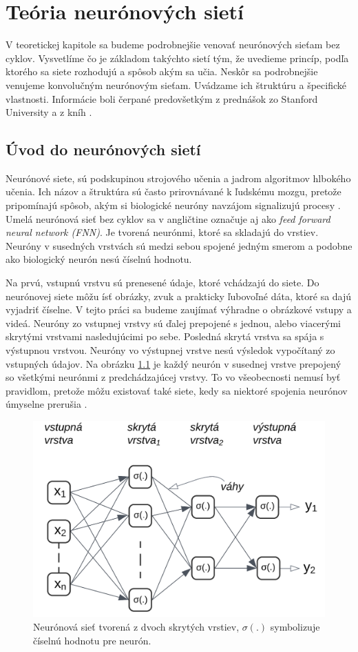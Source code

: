 \chapter{Teória neurónových sietí}\label{chap:theory}

V teoretickej kapitole sa budeme podrobnejšie venovať neurónových sieťam bez cyklov. Vysvetlíme čo je základom takýchto sietí tým, že uvedieme princíp, podľa ktorého sa siete rozhodujú a spôsob akým sa učia. Neskôr sa podrobnejšie venujeme konvolučným neurónovým sieťam. Uvádzame ich štruktúru a špecifické vlastnosti. Informácie boli čerpané predovšetkým z prednášok zo Stanford University \cite{SF} a z kníh \cite{RosinPaulL2019RIAa, Goodfellow-et-al-2016}. 

\section{Úvod do neurónových sietí}

Neurónové siete, sú podskupinou strojového učenia a jadrom algoritmov hlbokého učenia. Ich názov a štruktúra sú často prirovnávané k ľudskému mozgu, pretože pripomínajú spôsob, akým si biologické neuróny navzájom signalizujú procesy \cite{Shanmuganathan2016}. Umelá neurónová sieť bez cyklov sa v angličtine označuje aj ako \textit{feed forward neural network (FNN)}. Je tvorená neurónmi, ktoré sa skladajú do vrstiev. Neuróny v susedných vrstvách sú medzi sebou spojené jedným smerom a podobne ako biologický neurón nesú číselnú hodnotu. 

Na prvú, vstupnú vrstvu sú prenesené údaje, ktoré vchádzajú do siete. Do neurónovej siete môžu ísť obrázky, zvuk a prakticky ľubovoľné dáta, ktoré sa dajú vyjadriť číselne. V tejto práci sa budeme zaujímať výhradne o obrázkové vstupy a videá. Neuróny zo vstupnej vrstvy sú ďalej prepojené s jednou, alebo viacerými skrytými vrstvami nasledujúcimi po sebe. Posledná skrytá vrstva sa spája s výstupnou vrstvou. Neuróny vo výstupnej vrstve nesú výsledok vypočítaný zo vstupných údajov. Na obrázku \ref{img:network} je každý neurón v susednej vrstve prepojený so všetkými neurónmi z predchádzajúcej vrstvy. To vo všeobecnosti nemusí byť pravidlom, pretože môžu existovať také siete, kedy sa niektoré spojenia neurónov úmyselne prerušia \cite{DettmersTim2019SNfS}. 
\\
\begin{figure}[ht]
    \centering
    \includegraphics[width=.6\textwidth]{images/02/mynn.png}
    \caption{Neurónová sieť tvorená z dvoch skrytých vrstiev, \begin{math}\sigma(.)\end{math} symbolizuje číselnú hodnotu pre neurón. }
    \label{img:network}
\end{figure}

